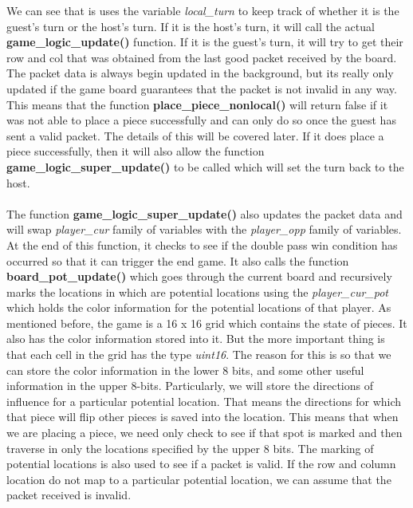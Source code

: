 \documentclass[a4paper, 12pt]{article}
\begin{document}
    We can see that is uses the variable \textit{local\_turn} to keep track of
    whether it is the guest's turn or the host's turn. If it is the host's
    turn, it will call the actual \textbf{game\_logic\_update()} function.
    If it is the guest's turn, it will try to get their row and col that
    was obtained from the last good packet received by the board. The packet
    data is always begin updated in the background, but its really only updated
    if the game board guarantees that the packet is not invalid in any way.
    This means that the function \textbf{place\_piece\_nonlocal()} will return
    false if it was not able to place a piece successfully and can only do so
    once the guest has sent a valid packet. The details of this will be 
    covered later. If it does place a piece successfully, then it will also
    allow the function \textbf{game\_logic\_super\_update()} to be called
    which will set the turn back to the host.
    \\ \\
    The function \textbf{game\_logic\_super\_update()} also updates the packet
    data and will swap \textit{player\_cur} family of variables with the
    \textit{player\_opp} family of variables. At the end of this function,
    it checks to see if the double pass win condition has occurred so that it
    can trigger the end game. It also calls the function 
    \textbf{board\_pot\_update()} which goes through the current board and
    recursively marks the locations in which are potential locations using the
    \textit{player\_cur\_pot} which holds the color information for the
    potential locations of that player. As mentioned before, the game is a 16
    x 16 grid which contains the state of pieces. It also has the color
    information stored into it. But the more important thing is that each cell
    in the grid has the type \textit{uint16}. The reason for this is so that
    we can store the color information in the lower 8 bits, and some other
    useful information in the upper 8-bits. Particularly, we will store the
    directions of influence for a particular potential location. That means the
    directions for which that piece will flip other pieces is saved into the
    location. This means that when we are placing a piece, we need only check
    to see if that spot is marked and then traverse in only the locations
    specified by the upper 8 bits. The marking of potential locations is also
    used to see if a packet is valid. If the row and column location do not 
    map to a particular potential location, we can assume that the packet
    received is invalid.
\end{document}
